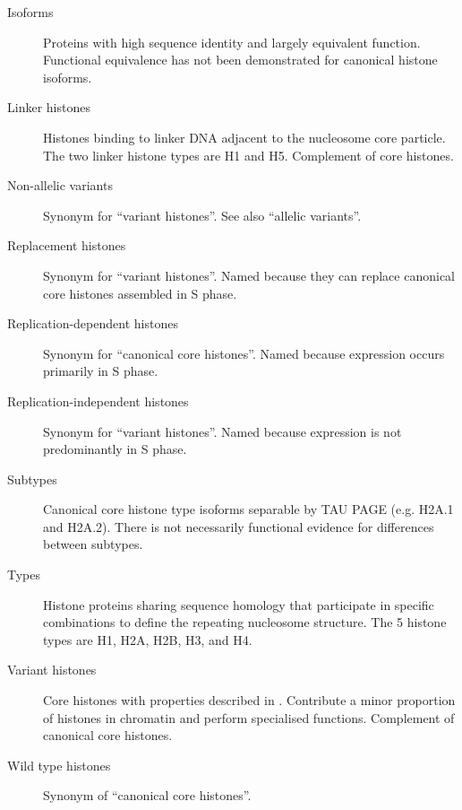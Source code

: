 {\begin{shaded}
\begin{description}
        \item[Isoforms] \hfill \newline
        Proteins with high sequence identity and largely equivalent function.
        Functional equivalence has not been demonstrated for canonical histone isoforms.

        \item[Linker histones] \hfill \newline
        Histones binding to linker DNA adjacent to the nucleosome core particle.
        The two linker histone types are H1 and H5. Complement of core histones.

        \item[Non-allelic variants] \hfill \newline
        Synonym for ``variant histones''. See also ``allelic variants''.

        \item[Replacement histones] \hfill \newline
        Synonym for ``variant histones''.
        Named because they can replace canonical core histones assembled in S phase.

        \item[Replication-dependent histones] \hfill \newline
        Synonym for ``canonical core histones''.
        Named because expression occurs primarily in S phase.

        \item[Replication-independent histones] \hfill \newline
        Synonym for ``variant histones''.
        Named because expression is not predominantly in S phase.

        \item[Subtypes] \hfill \newline
        Canonical core histone type isoforms separable by TAU PAGE
        (e.g. H2A.1 and H2A.2). There is not necessarily functional evidence
        for differences between subtypes.

        \item[Types] \hfill \newline
        Histone proteins sharing sequence homology
        that participate in specific combinations to define the repeating nucleosome structure.
        The 5 histone types are H1, H2A, H2B, H3, and H4.

        \item[Variant histones] \hfill \newline
        Core histones with properties described in .
        Contribute a minor proportion of histones in chromatin and perform specialised functions.
        Complement of canonical core histones.

        \item[Wild type histones] \hfill \newline
        Synonym of ``canonical core histones''.
      \end{description}
    \end{shaded}
  }

